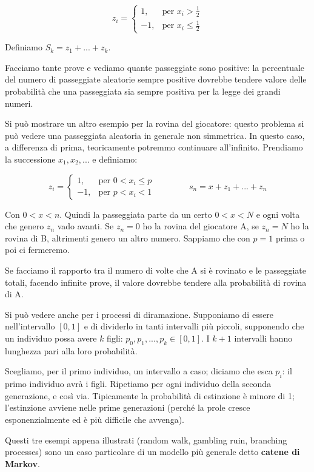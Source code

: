 \documentclass[a4paper,12pt]{book}
\begin{document}
$$
z_i =
\begin{cases}
	1, & \text{per } x_i > \frac{1}{2}\\
	-1, & \text{per } x_i \le \frac{1}{2}
\end{cases}
$$

Definiamo $ S_k = z_1 + ... + z_k $.

Facciamo tante prove e vediamo quante passeggiate sono positive: la percentuale del numero di passeggiate aleatorie sempre positive dovrebbe tendere valore delle probabilità che una passeggiata sia sempre positiva per la legge dei grandi numeri. 

Si può mostrare un altro esempio per la rovina del giocatore: questo problema si può vedere una passeggiata aleatoria in generale non simmetrica. In questo caso, a differenza di prima, teoricamente potremmo continuare all'infinito. Prendiamo la successione $ x_1, x_2, ... $ e definiamo:

$$
	z_i =
	\begin{cases}
		1, & \text{per } 0 < x_i \le p\\
		-1, & \text{per } p < x_i < 1
	\end{cases}
	\qquad \qquad s_n = x + z_1 + ... + z_n
$$

Con $ 0 < x < n $. Quindi la passeggiata parte da un certo $ 0 < x < N $ e ogni volta che genero $ z_n $ vado avanti. Se $ z_n = 0 $ ho la rovina del giocatore A, se $ z_n  = N $ ho la rovina di B, altrimenti genero un altro numero. Sappiamo che con $ p = 1 $ prima o poi ci fermeremo. 

Se facciamo il rapporto tra il numero di volte che A si è rovinato e le passeggiate totali, facendo infinite prove, il valore dovrebbe tendere alla probabilità di rovina di A. 

Si può vedere anche per i processi di diramazione. Supponiamo di essere nell'intervallo $ [0,1] $ e di dividerlo in tanti intervalli più piccoli, supponendo che un individuo possa avere $ k $ figli: $ p_0, p_1, ..., p_k  \in [0,1]$. I $ k+1 $ intervalli hanno lunghezza pari alla loro probabilità. 

Scegliamo, per il primo individuo, un intervallo a caso; diciamo che esca $ p_i $: il primo individuo avrà i figli. Ripetiamo per ogni individuo della seconda generazione, e così via. Tipicamente la probabilità di estinzione è minore di 1; l'estinzione avviene nelle prime generazioni (perché la prole cresce esponenzialmente ed è più difficile che avvenga).

Questi tre esempi appena illustrati (random walk, gambling ruin, branching processes) sono un caso particolare di un modello più generale detto \textbf{catene di Markov}. 
\end{document}
